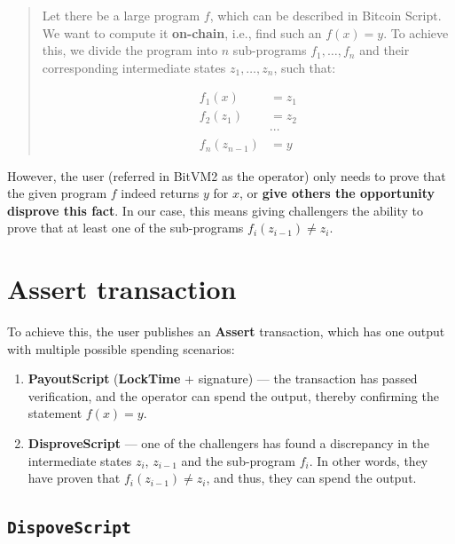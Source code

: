 \documentclass[11pt]{article}
\begin{document}
\begin{quote}
  Let there be a large program \(f\), which can be described in Bitcoin
  Script. We want to compute it \textbf{\textbf{on-chain}}, i.e., find
  such an \(f(x) = y\). To achieve this, we divide the program into
  \(n\) sub-programs \(f_1, \ldots, f_n\) and their corresponding
  intermediate states \(z_1, \ldots, z_n\), such that:

  \begin{equation}
    \begin{aligned}
      f_1(x) &= z_1 \\
      f_2(z_1) &= z_2 \\
      &\cdots \\
      f_n(z_{n-1}) &= y
    \end{aligned}
  \end{equation}
\end{quote}

However, the user (referred in BitVM2 as the operator) only needs to
prove that the given program \(f\) indeed returns \(y\) for \(x\), or
\textbf{give others the opportunity disprove this fact}. In our case,
this means giving challengers the ability to prove that at least one
of the sub-programs \(f_i(z_{i-1}) \neq z_i\).

\section{\textbf{Assert} transaction}\label{sec:assert-tx}

To achieve this, the user publishes an \textbf{Assert} transaction,
which has one output with multiple possible spending scenarios:

\begin{enumerate}
  \item \textbf{PayoutScript} (\textbf{LockTime} + signature) --- the
    transaction has passed verification, and the operator can spend the
    output, thereby confirming the statement \(f(x) = y\).
  \item \textbf{DisproveScript} --- one of the challengers has found a
    discrepancy in the intermediate states \(z_i\), \(z_{i-1}\) and the
    sub-program \(f_i\). In other words, they have proven that
    \(f_i(z_{i-1}) \neq z_i\), and thus, they can spend the output.
\end{enumerate}

\subsection{\texttt{DispoveScript}}\label{sec:dispove-script}
\end{document}
